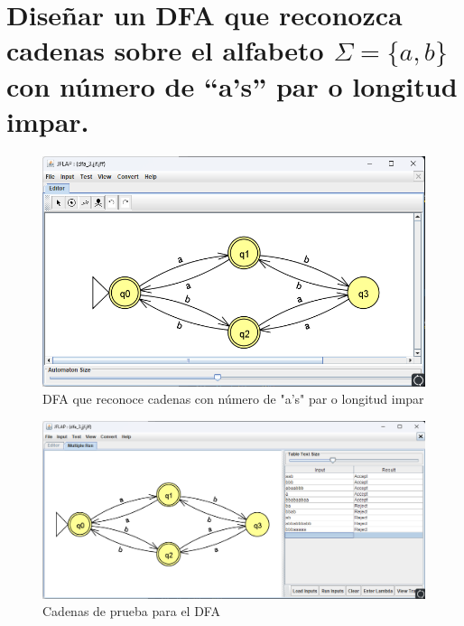 \documentclass[11pt]{report}
\begin{document}
\section{Diseñar un DFA que reconozca cadenas sobre el alfabeto $\Sigma = \{a, b\}$ con número de “a's” par o longitud impar.}
\begin{figure}[H]
  \centering
  \includegraphics[scale=0.6]{img/DFA_03.png}
  \caption{DFA que reconoce cadenas con número de "a's" par o longitud impar}
\end{figure}

\begin{figure}[H]
  \centering
  \includegraphics[scale=0.6]{img/DFA_03_test.png}
  \caption{Cadenas de prueba para el DFA}
\end{figure}

\newpage
\end{document}
